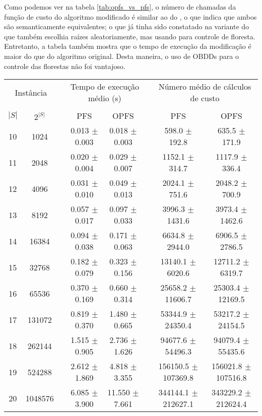 Como podemos ver na tabela \ref{tab:opfs_vs_pfs}, o número de chamadas
da função de custo do algoritmo modificado é similar ao do 
, o que indica que ambos são semanticamente equivalentes; o 
que já tinha sido constatado na variante do  que também
escolhia raízes aleatoriamente, mas usando  para controle
de floresta. Entretanto, a tabela também mostra que o tempo de execução
da modificação é maior do que do algoritmo original. Desta maneira, o
uso de OBDDs para o controle das florestas não foi vantajoso.

\begin{table}
\centering
\footnotesize
\begin{tabular}{cc c cc c cc}
\toprule
\multicolumn{2}{c}{Instância} & \phantom{} & \multicolumn{2}{c}{Tempo de execução médio (s)}  & \phantom{} & \multicolumn{2}{c}{Número médio de cálculos de custo}\\
\cline{1-2}\cline{4-5}\cline{7-8}\\
$|S|$ & $2^{|S|}$ && PFS & OPFS && PFS & OPFS \\
10 &    1024 &&  0.013 $\pm$ 0.003 & 0.018 $\pm$ 0.003 &&  598.0 $\pm$ 192.8 & 635.5 $\pm$ 171.9 \\
11 &    2048 &&  0.020 $\pm$ 0.004 & 0.029 $\pm$ 0.007 &&  1152.1 $\pm$ 314.7 & 1117.9 $\pm$ 336.4 \\
12 &    4096 &&  0.031 $\pm$ 0.010 & 0.049 $\pm$ 0.013 &&  2024.1 $\pm$ 751.6 & 2048.2 $\pm$ 700.9 \\
13 &    8192 &&  0.057 $\pm$ 0.017 & 0.097 $\pm$ 0.033 &&  3996.3 $\pm$ 1431.6 & 3973.4 $\pm$ 1462.6 \\
14 &   16384 &&  0.094 $\pm$ 0.038 & 0.171 $\pm$ 0.063 &&  6634.8 $\pm$ 2944.0 & 6906.5 $\pm$ 2786.5 \\
15 &   32768 &&  0.182 $\pm$ 0.079 & 0.323 $\pm$ 0.156 &&  13140.1 $\pm$ 6020.6 & 12711.2 $\pm$ 6319.7 \\
16 &   65536 &&  0.370 $\pm$ 0.169 & 0.660 $\pm$ 0.314 &&  25658.2 $\pm$ 11606.7 & 25303.4 $\pm$ 12169.5 \\
17 &  131072 &&  0.819 $\pm$ 0.370 & 1.480 $\pm$ 0.665 &&  53344.9 $\pm$ 24350.4 & 53217.2 $\pm$ 24154.5 \\
18 &  262144 &&  1.515 $\pm$ 0.905 & 2.736 $\pm$ 1.626 &&  94677.6 $\pm$ 54496.3 & 94079.4 $\pm$ 55435.6 \\
19 &  524288 &&  2.612 $\pm$ 1.869 & 4.818 $\pm$ 3.355 &&  156150.5 $\pm$ 107369.8 & 156021.8 $\pm$ 107516.8 \\
20 & 1048576 &&  6.085 $\pm$ 3.900 & 11.550 $\pm$ 7.661 &&  344144.1 $\pm$ 212627.1 & 343229.2 $\pm$ 212624.4 \\

\end{tabular}
\end{table}
